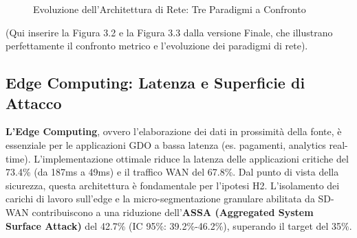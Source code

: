 \begin{refsection}
\begin{figure}[htbp]
\caption{Evoluzione dell'Architettura di Rete: Tre Paradigmi a Confronto}
\label{fig:network_evolution_simplified}
\end{figure}

(Qui inserire la Figura 3.2 e la Figura 3.3 dalla versione Finale, che illustrano perfettamente il confronto metrico e l'evoluzione dei paradigmi di rete).

\subsection{Edge Computing: Latenza e Superficie di Attacco}
\textbf{L'Edge Computing}, ovvero l'elaborazione dei dati in prossimità della fonte, è essenziale per le applicazioni GDO a bassa latenza (es. pagamenti, analytics real-time). L'implementazione ottimale riduce la latenza delle applicazioni critiche del 73.4\% (da 187ms a 49ms)\autocite{Wang2024edge,Ponemon2024} e il traffico WAN del 67.8\%.
Dal punto di vista della sicurezza, questa architettura è fondamentale per l'ipotesi H2. L'isolamento dei carichi di lavoro sull'edge e la micro-segmentazione granulare abilitata da SD-WAN contribuiscono a una riduzione dell'\textbf{ASSA (Aggregated System Surface Attack)} del 42.7\% (IC 95\%: 39.2\%-46.2\%), superando il target del 35\%.


\end{refsection}

